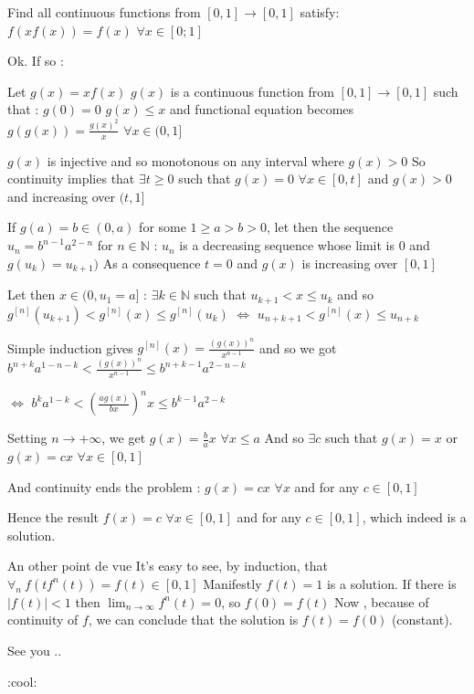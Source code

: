 \begin{solution}
	\begin{tcolorbox}Find all continuous functions from $[0,1]\to[0,1]$ satisfy: $f(xf(x))=f(x)$  $\forall x\in [0;1]$\end{tcolorbox}
Ok. If so :

Let $g(x)=xf(x)$
$g(x)$ is a continuous function from $[0,1]\to[0,1]$ such that :
$g(0)=0$
$g(x)\le x$
and functional equation becomes $g(g(x))=\frac{g(x)^2}x$ $\forall x\in(0,1]$

$g(x)$ is injective and so monotonous on any interval where $g(x)>0$
So continuity implies that $\exists t\ge 0$ such that $g(x)=0$ $\forall x\in[0,t]$ and $g(x)>0$ and increasing over $(t,1]$


If $g(a)=b\in(0,a)$ for some $1\ge a>b>0$, let then the sequence $u_n=b^{n-1}a^{2-n}$ for $n\in\mathbb N$ : 
$u_n$ is a decreasing sequence whose limit is $0$ and $g(u_k)=u_{k+1})$
As a consequence $t=0$ and $g(x)$ is increasing over $[0,1]$

Let then $x\in(0,u_1=a]$ : $\exists k\in\mathbb N$ such that $u_{k+1}<x\le u_k$ and so $g^{[n]}(u_{k+1})<g^{[n]}(x)\le g^{[n]}(u_{k})$
$\iff$ $u_{n+k+1}<g^{[n]}(x)\le u_{n+k}$

Simple induction gives $g^{[n]}(x)=\frac{(g(x))^n}{x^{n-1}}$ and so we got $b^{n+k}a^{1-n-k}<\frac{(g(x))^n}{x^{n-1}}\le b^{n+k-1}a^{2-n-k}$

$\iff$ $b^{k}a^{1-k}<\left(\frac{ag(x)}{bx}\right)^nx\le b^{k-1}a^{2-k}$
           
Setting $n\to+\infty$, we get $g(x)=\frac ba x$ $\forall x\le a$
And so $\exists c$ such that $g(x)=x$ or $g(x)=cx$ $\forall x\in[0,1]$

And continuity ends the problem : $g(x)=cx$ $\forall x$ and for any $c\in[0,1]$

Hence the result $\boxed{f(x)=c}$ $\forall x\in[0,1]$ and for any $c\in[0,1]$, which indeed is a solution.
\end{solution}



\begin{solution}
	An other  point de vue   
It's easy to see, by induction,  that $\forall_n \ f(tf^n(t))=f(t)\in [0,1]$
Manifestly $f(t)=1$ is a solution. 
If  there is $| f(t)|<1$  then $\lim_{n\rightarrow \infty}f^n(t)=0$, so $f(0)=f(t)$
Now , because of continuity of $f$, we can conclude that  the solution is $f(t)=f(0)$ (constant). 

See you ..

 :cool:
\end{solution}



